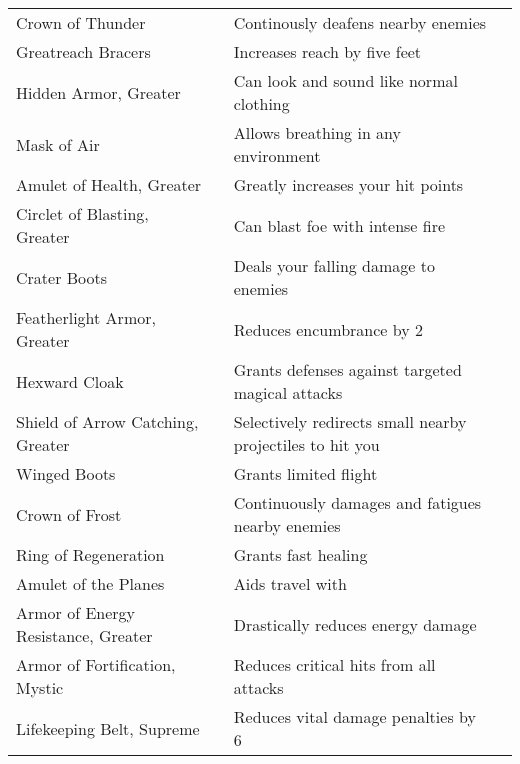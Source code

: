 \begin{longtabuwrapper}
\begin{longtabu}{l l X l}
Crown of Thunder &  & Continously deafens nearby enemies & \pageref{item:Crown of Thunder} \\
Greatreach Bracers &  & Increases reach by five feet & \pageref{item:Greatreach Bracers} \\
Hidden Armor, Greater &  & Can look and sound like normal clothing & \pageref{item:Hidden Armor, Greater} \\
Mask of Air &  & Allows breathing in any environment & \pageref{item:Mask of Air} \\
Amulet of Health, Greater &  & Greatly increases your hit points & \pageref{item:Amulet of Health, Greater} \\
Circlet of Blasting, Greater &  & Can blast foe with intense fire & \pageref{item:Circlet of Blasting, Greater} \\
Crater Boots &  & Deals your falling damage to enemies & \pageref{item:Crater Boots} \\
Featherlight Armor, Greater &  & Reduces encumbrance by 2 & \pageref{item:Featherlight Armor, Greater} \\
Hexward Cloak &  & Grants  defenses against targeted magical attacks & \pageref{item:Hexward Cloak} \\
Shield of Arrow Catching, Greater &  & Selectively redirects small nearby projectiles to hit you & \pageref{item:Shield of Arrow Catching, Greater} \\
Winged Boots &  & Grants limited flight & \pageref{item:Winged Boots} \\
Crown of Frost &  & Continuously damages and fatigues nearby enemies & \pageref{item:Crown of Frost} \\
Ring of Regeneration &  & Grants fast healing & \pageref{item:Ring of Regeneration} \\
Amulet of the Planes &  & Aids travel with  & \pageref{item:Amulet of the Planes} \\
Armor of Energy Resistance, Greater &  & Drastically reduces energy damage & \pageref{item:Armor of Energy Resistance, Greater} \\
Armor of Fortification, Mystic &  & Reduces critical hits from all attacks & \pageref{item:Armor of Fortification, Mystic} \\
Lifekeeping Belt, Supreme &  & Reduces vital damage penalties by 6 & \pageref{item:Lifekeeping Belt, Supreme} \\

\end{longtabu}
\end{longtabuwrapper}

